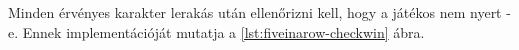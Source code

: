 \texttt{}



Minden érvényes karakter lerakás után ellenőrizni kell, hogy a játékos nem nyert -e. Ennek implementációját mutatja a \ref{lst:fiveinarow-checkwin} ábra.




















